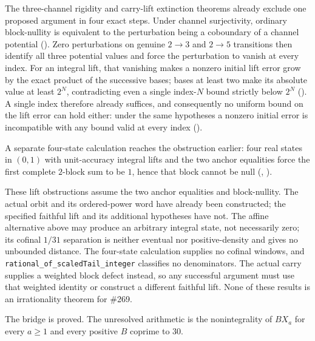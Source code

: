 The three-channel rigidity and carry-lift extinction theorems already exclude
one proposed argument in four exact steps.  Under channel surjectivity, ordinary
block-nullity is equivalent to the perturbation being a coboundary of a
channel potential
().  Zero perturbations on genuine $2\to3$ and $2\to5$ transitions
then identify all three potential values and force the perturbation to vanish
at every index.  For an integral lift, that vanishing makes a nonzero initial
lift error grow by the exact product of the successive bases; bases at least
two make its absolute value at least $2^N$, contradicting even a single
index-$N$ bound strictly below $2^N$
().  A single index therefore already suffices, and consequently no
uniform bound on the lift error can hold either: under the same hypotheses a
nonzero initial error is incompatible with any bound valid at every index
().

A separate four-state calculation reaches the obstruction earlier: four real
states in $(0,1)$ with unit-accuracy integral lifts and the two anchor
equalities force the first complete $2$-block sum to be $1$, hence that block
cannot be null
(,
).

These lift obstructions assume the two anchor equalities and block-nullity.
The actual orbit and its ordered-power word have already been constructed;
the specified faithful lift and its additional hypotheses have not.  The affine alternative above may produce an
arbitrary integral state, not necessarily zero; its cofinal $1/31$ separation
is neither eventual nor positive-density and gives no unbounded distance.
The four-state calculation supplies no cofinal windows, and
\texttt{rational\_of\_scaledTail\_integer} classifies no denominators.  The
actual carry supplies a weighted block defect instead, so any successful
argument must use that weighted identity or construct a different faithful
lift.  None of these results is an irrationality theorem for \#269.

The bridge is proved.  The unresolved arithmetic is the nonintegrality
of $BX_a$ for every $a\ge1$ and every positive $B$ coprime to $30$.
